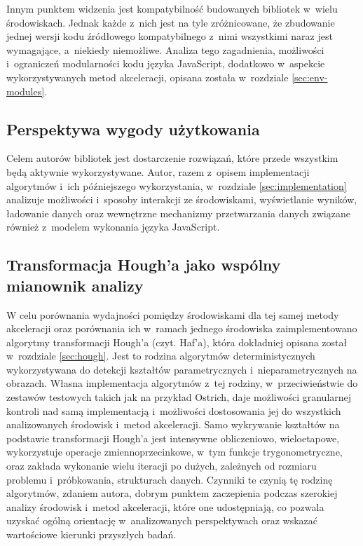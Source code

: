 Innym punktem widzenia jest kompatybilność budowanych bibliotek w~wielu środowiskach. Jednak każde z~nich jest na tyle zróżnicowane, że zbudowanie jednej wersji kodu źródłowego kompatybilnego z~nimi wszystkimi naraz jest wymagające, a~niekiedy niemożliwe. Analiza tego zagadnienia, możliwości i~ograniczeń modularności kodu języka JavaScript, dodatkowo w~aspekcie wykorzystywanych metod akceleracji, opisana została w~rozdziale \ref{sec:env-modules}.

\subsection{Perspektywa wygody użytkowania}

Celem autorów bibliotek jest dostarczenie rozwiązań, które przede wszystkim będą aktywnie wykorzystywane. Autor, razem z~opisem implementacji algorytmów i~ich późniejszego wykorzystania, w~rozdziale \ref{sec:implementation} analizuje możliwości i~sposoby interakcji ze środowiskami, wyświetlanie wyników, ładowanie danych oraz wewnętrzne mechanizmy przetwarzania danych związane również z~modelem wykonania języka JavaScript.

\subsection{Transformacja Hough'a jako wspólny mianownik analizy}

W celu porównania wydajności pomiędzy środowiskami dla tej samej metody akceleracji oraz porównania ich w~ramach jednego środowiska zaimplementowano algorytmy transformacji Hough'a (czyt. Haf'a), która dokładniej opisana został w~rozdziale \ref{sec:hough}. Jest to rodzina algorytmów deterministycznych wykorzystywana do detekcji kształtów parametrycznych i~nieparametrycznych na obrazach.  Własna implementacja algorytmów z~tej rodziny, w~przeciwieństwie do zestawów testowych takich jak na przykład Ostrich\cite{ostrich}, daje możliwości granularnej kontroli nad samą implementacją i~możliwości dostosowania jej do wszystkich analizowanych środowisk i~metod akceleracji. Samo wykrywanie kształtów na podstawie transformacji Hough'a jest intensywne obliczeniowo, wieloetapowe, wykorzystuje operacje zmiennoprzecinkowe, w~tym funkcje trygonometryczne, oraz zakłada wykonanie wielu iteracji po dużych, zależnych od rozmiaru problemu i~próbkowania, strukturach danych. Czynniki te czynią tę rodzinę algorytmów, zdaniem autora, dobrym punktem zaczepienia podczas szerokiej analizy środowisk i~metod akceleracji, które one udostępniają, co pozwala uzyskać ogólną orientację w~analizowanych perspektywach oraz wskazać wartościowe kierunki przyszłych badań. 

